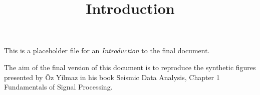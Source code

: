 \title{Introduction}

This is a placeholder file for an \emph{Introduction} to the final document.

The aim of the final version of this document is to reproduce the synthetic figures presented by {\"O}z Yilmaz in his book Seismic Data Analysis, Chapter 1 Fundamentals of Signal Processing.
